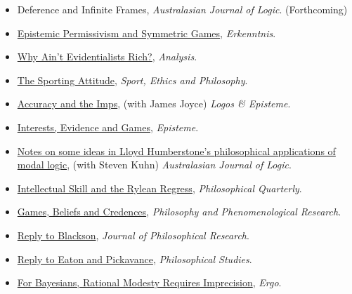 \documentclass[
  10pt,
  letterpaper,
  DIV=11,
  numbers=noendperiod,
  twoside]{scrartcl}
\providecommand{\tightlist}{%
  \setlength{\itemsep}{0pt}\setlength{\parskip}{0pt}}\usepackage{longtable,booktabs,array}
\begin{document}
\begin{itemize}
\tightlist
\item
  Deference and Infinite Frames, \emph{Australasian Journal of Logic}.
  (Forthcoming)
\item
  \href{https://brian.weatherson.org/quarto/posts/symmetric-permissivism/permissivism-and-symmetric-games.html}{Epistemic
  Permissivism and Symmetric Games}, \emph{Erkenntnis}.
\item
  \href{https://brian.weatherson.org/quarto/posts/war-on-war/war-on-war.html}{Why
  Ain't Evidentialists Rich?}, \emph{Analysis}.
\item
  \href{https://brian.weatherson.org/quarto/posts/borge/the-sporting-attitude.html}{The
  Sporting Attitude}, \emph{Sport, Ethics and Philosophy}.
\item
  \href{https://brian.weatherson.org/quarto/posts/imps/accuracy-and-the-imps.html}{Accuracy
  and the Imps}, (with James Joyce) \emph{Logos \& Episteme}.
\item
  \href{https://brian.weatherson.org/quarto/posts/ieg/interests-evidence-and-games.html}{Interests,
  Evidence and Games}, \emph{Episteme}.
\item
  \href{https://brian.weatherson.org/quarto/posts/humberstone-modal/notes-on-some-ideas-in-lloyd-humberstones-philosophical-applications-of-modal-logic.html}{Notes
  on some ideas in Lloyd Humberstone's philosophical applications of
  modal logic}, (with Steven Kuhn) \emph{Australasian Journal of Logic}.
\item
  \href{https://brian.weatherson.org/quarto/posts/ryle-regress/ryle-regress.html}{Intellectual
  Skill and the Rylean Regress}, \emph{Philosophical Quarterly}.
\item
  \href{https://brian.weatherson.org/quarto/posts/gbc/games-beliefs-and-credences.html}{Games,
  Beliefs and Credences}, \emph{Philosophy and Phenomenological
  Research}.
\item
  \href{https://brian.weatherson.org/quarto/posts/reply-blackson/reply-to-blackson.html}{Reply
  to Blackson}, \emph{Journal of Philosophical Research}.
\item
  \href{https://brian.weatherson.org/quarto/posts/reply-eaton-pickavance/reply-to-eaton-and-pickavance.html}{Reply
  to Eaton and Pickavance}, \emph{Philosophical Studies}.
\item
  \href{https://brian.weatherson.org/quarto/posts/modesty/for-bayesians-rational-modesty-requires-imprecision.html}{For
  Bayesians, Rational Modesty Requires Imprecision}, \emph{Ergo}.

\end{itemize}
\end{document}
